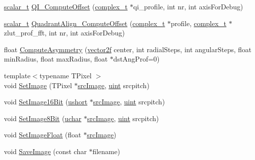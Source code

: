 \begin{DoxyCompactItemize}
\item 
\hyperlink{scalar__types_8h_a03fcef84665498b9cfcf9c7cc25574e9}{scalar\+\_\+t} \hyperlink{class_c_p_u_tracker_ac714cf7bcefab595734cc2768a4d4236}{Q\+I\+\_\+\+Compute\+Offset} (\hyperlink{scalar__types_8h_abaffcd8bea58063cc6c608dda082ad05}{complex\+\_\+t} $\ast$qi\+\_\+profile, int nr, int axis\+For\+Debug)
\item 
\hyperlink{scalar__types_8h_a03fcef84665498b9cfcf9c7cc25574e9}{scalar\+\_\+t} \hyperlink{class_c_p_u_tracker_a71992f53900219b3c62bf559b9e28980}{Quadrant\+Align\+\_\+\+Compute\+Offset} (\hyperlink{scalar__types_8h_abaffcd8bea58063cc6c608dda082ad05}{complex\+\_\+t} $\ast$profile, \hyperlink{scalar__types_8h_abaffcd8bea58063cc6c608dda082ad05}{complex\+\_\+t} $\ast$zlut\+\_\+prof\+\_\+fft, int nr, int axis\+For\+Debug)
\item 
float \hyperlink{class_c_p_u_tracker_a05039be68af2184529ccb2a8713f7cbe}{Compute\+Asymmetry} (\hyperlink{std__incl_8h_aba974726076ec2d63a67114c536d123e}{vector2f} center, int radial\+Steps, int angular\+Steps, float min\+Radius, float max\+Radius, float $\ast$dst\+Ang\+Prof=0)
\item 
{\footnotesize template$<$typename T\+Pixel $>$ }\\void \hyperlink{class_c_p_u_tracker_ab64472ecfac7e3ae784dc6bc6271a77f}{Set\+Image} (T\+Pixel $\ast$\hyperlink{class_c_p_u_tracker_a393778bc9b49eb6d5014fd814c5dfcdf}{src\+Image}, \hyperlink{std__incl_8h_a91ad9478d81a7aaf2593e8d9c3d06a14}{uint} srcpitch)
\item 
void \hyperlink{class_c_p_u_tracker_a0f15bef0a76790ce0ba31ce104e3c39a}{Set\+Image16\+Bit} (\hyperlink{std__incl_8h_ab95f123a6c9bcfee6a343170ef8c5f69}{ushort} $\ast$\hyperlink{class_c_p_u_tracker_a393778bc9b49eb6d5014fd814c5dfcdf}{src\+Image}, \hyperlink{std__incl_8h_a91ad9478d81a7aaf2593e8d9c3d06a14}{uint} srcpitch)
\item 
void \hyperlink{class_c_p_u_tracker_a6bca00a1c694bec1c0858a5794580cce}{Set\+Image8\+Bit} (\hyperlink{std__incl_8h_a65f85814a8290f9797005d3b28e7e5fc}{uchar} $\ast$\hyperlink{class_c_p_u_tracker_a393778bc9b49eb6d5014fd814c5dfcdf}{src\+Image}, \hyperlink{std__incl_8h_a91ad9478d81a7aaf2593e8d9c3d06a14}{uint} srcpitch)
\item 
void \hyperlink{class_c_p_u_tracker_ab0a855205943f129c8ddd19d34c4a6b3}{Set\+Image\+Float} (float $\ast$\hyperlink{class_c_p_u_tracker_a393778bc9b49eb6d5014fd814c5dfcdf}{src\+Image})
\item 
void \hyperlink{class_c_p_u_tracker_ad43acbdbc335850b8b01a5c6508ef902}{Save\+Image} (const char $\ast$filename)

\end{DoxyCompactItemize}
